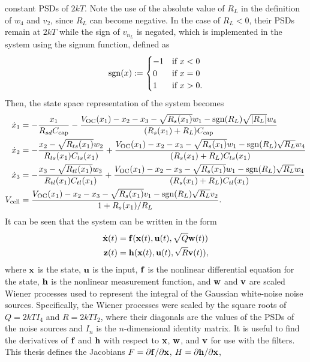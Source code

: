 \documentclass[../zhang_thesis.tex]{subfiles}
\begin{document}
constant PSDs of $2kT$. Note the use of the absolute value of $R_L$ in the definition of $w_4$ and $v_2$, since $R_L$ can become negative. In the case of $R_L<0$, their PSDs remain at $2kT$ while the sign of $v_{n_L}$ is negated, which is implemented in the system using the signum function, defined as
\begin{equation}
    \operatorname{sgn}(x) := \begin{cases}
        -1 & \text{if } x<0 \\
        0 & \text{if } x=0 \\
        1 & \text{if } x>0.
    \end{cases}
\end{equation}
Then, the state space representation of the system becomes
\begin{align}
    \dot{x}_1 &= - \frac{x_1}{R_{sd}C_\text{cap}} - \frac{V_\text{OC}(x_1) - x_2 - x_3 - \sqrt{R_s(x_1)}w_1 - \operatorname{sgn}(R_L)\sqrt{|R_L|}w_4}{(R_s(x_1)+R_L)C_\text{cap}} \\
    \dot{x}_2 &= - \frac{x_2 - \sqrt{R_{ts}(x_1)}w_2}{R_{ts}(x_1)C_{ts}(x_1)} + \frac{V_\text{OC}(x_1) - x_2 - x_3 - \sqrt{R_s(x_1)}w_1 - \operatorname{sgn}(R_L)\sqrt{R_L}w_4}{(R_s(x_1)+R_L)C_{ts}(x_1)} \\
    \dot{x}_3 &= - \frac{x_3 - \sqrt{R_{tl}(x_1)}w_3}{R_{tl}(x_1)C_{tl}(x_1)} + \frac{V_\text{OC}(x_1) - x_2 - x_3 - \sqrt{R_s(x_1)}w_1 - \operatorname{sgn}(R_L)\sqrt{R_L}w_4}{(R_s(x_1)+R_L)C_{tl}(x_1)} \\
    V_\text{cell} &= \frac{V_\text{OC}(x_1) - x_2 - x_3 - \sqrt{R_s(x_1)}v_1 - \operatorname{sgn}(R_L)\sqrt{R_L}v_2}{1+R_s(x_1)/R_L}.
\end{align}
It can be seen that the system can be written in the form
\begin{align}
    \dot{\mathbf{x}}(t) &= \mathbf{f}(\mathbf{x}(t),\mathbf{u}(t),\sqrt{Q} \mathbf{w}(t)) \label{eq:genct1} \\
    \mathbf{z}(t) &= \mathbf{h}(\mathbf{x}(t),\mathbf{u}(t),\sqrt{R} \mathbf{v}(t)), \label{eq:genct2}
\end{align}
where $\mathbf{x}$ is the state, $\mathbf{u}$ is the input, $\mathbf{f}$ is the nonlinear differential equation for the state, $\mathbf{h}$ is the nonlinear measurement function, and $\mathbf{w}$ and $\mathbf{v}$ are scaled Wiener processes used to represent the integral of the Gaussian white-noise noise sources. Specifically, the Wiener processes were scaled by the square roots of $Q=2kT I_4$ and $R=2kT I_2$, where their diagonals are the values of the PSDs of the noise sources and $I_n$ is the $n$-dimensional identity matrix. It is useful to find the derivatives of $\mathbf{f}$ and $\mathbf{h}$ with respect to $\mathbf{x}$, $\mathbf{w}$, and $\mathbf{v}$ for use with the filters. This thesis defines the Jacobians $F=\partial\mathbf{f}/\partial\mathbf{x}$, $H=\partial\mathbf{h}/\partial\mathbf{x}$,
\end{document}
